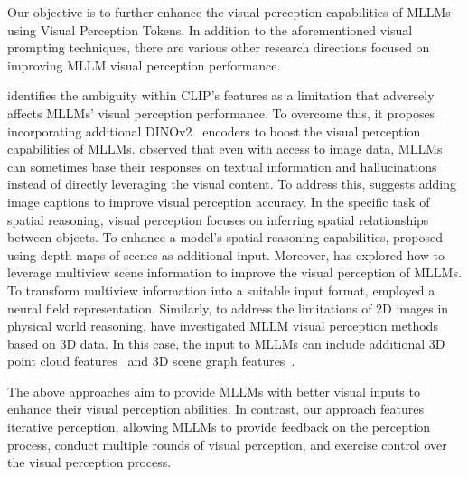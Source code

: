 Our objective is to further enhance the visual perception capabilities of MLLMs using Visual Perception Tokens. In addition to the aforementioned visual prompting techniques, there are various other research directions focused on improving MLLM visual perception performance.

\cite{mot} identifies the ambiguity within CLIP's features as a limitation that adversely affects MLLMs' visual perception performance. To overcome this, it proposes incorporating additional DINOv2~\cite{oquab2024dinov} encoders to boost the visual perception capabilities of MLLMs. 
\cite{wang2024pictureworththousandwords} observed that even with access to image data, MLLMs can sometimes base their responses on textual information and hallucinations instead of directly leveraging the visual content. To address this, \cite{wang2024pictureworththousandwords} suggests adding image captions to improve visual perception accuracy.
In the specific task of spatial reasoning, visual perception focuses on inferring spatial relationships between objects. To enhance a model's spatial reasoning capabilities, \cite{cheng2024spatialrgpt} proposed using depth maps of scenes as additional input. Moreover, \cite{cvpr23_3dclr} has explored how to leverage multiview scene information to improve the visual perception of MLLMs. To transform multiview information into a suitable input format, \cite{cvpr23_3dclr} employed a neural field representation. Similarly, to address the limitations of 2D images in physical world reasoning, \cite{Chen_2024_CVPR,zhu2024llava} have investigated MLLM visual perception methods based on 3D data. In this case, the input to MLLMs can include additional 3D point cloud features~\cite{hong20233dllminjecting3dworld} and 3D scene graph features~\cite{conceptgraphs}.

The above approaches aim to provide MLLMs with better visual inputs to enhance their visual perception abilities. In contrast, our approach features iterative perception, allowing MLLMs to provide feedback on the perception process, conduct multiple rounds of visual perception, and exercise control over the visual perception process.